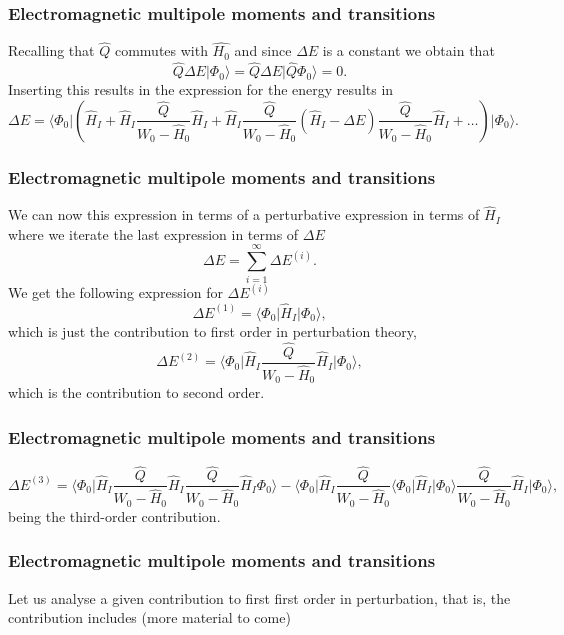 \documentclass{beamer}
\begin{document}
\begin{frame}
\frametitle{Electromagnetic multipole moments and transitions}

\begin{block}{}
Recalling that $\hat{Q}$ commutes with $\hat{H_0}$ and since $\Delta E$ is a constant we obtain that
\[
\hat{Q}\Delta E\vert \Phi_0\rangle = \hat{Q}\Delta E\vert \hat{Q}\Phi_0\rangle = 0.
\]
Inserting this results in the expression for the energy results in
\[
\Delta E=\langle \Phi_0\vert \left(\hat{H}_I+\hat{H}_I\frac{\hat{Q}}{W_0-\hat{H}_0}\hat{H}_I+
\hat{H}_I\frac{\hat{Q}}{W_0-\hat{H}_0}(\hat{H}_I-\Delta E)\frac{\hat{Q}}{W_0-\hat{H}_0}\hat{H}_I+\dots\right)\vert \Phi_0\rangle.
\]
\end{block}
\end{frame}

\begin{frame}
\frametitle{Electromagnetic multipole moments and transitions}

\begin{block}{}
We can now this expression in terms of a perturbative expression in terms
of $\hat{H}_I$ where we iterate the last expression in terms of $\Delta E$
\[
\Delta E=\sum_{i=1}^{\infty}\Delta E^{(i)}.
\]
We get the following expression for $\Delta E^{(i)}$
\[
\Delta E^{(1)}=\langle \Phi_0\vert \hat{H}_I\vert \Phi_0\rangle,
\] 
which is just the contribution to first order in perturbation theory,
\[
\Delta E^{(2)}=\langle\Phi_0\vert \hat{H}_I\frac{\hat{Q}}{W_0-\hat{H}_0}\hat{H}_I\vert \Phi_0\rangle, 
\]
which is the contribution to second order.
\end{block}
\end{frame}

\begin{frame}
\frametitle{Electromagnetic multipole moments and transitions}

\begin{block}{}
\[
\Delta E^{(3)}=\langle \Phi_0\vert \hat{H}_I\frac{\hat{Q}}{W_0-\hat{H}_0}\hat{H}_I\frac{\hat{Q}}{W_0-\hat{H}_0}\hat{H}_I\Phi_0\rangle-
\langle\Phi_0\vert \hat{H}_I\frac{\hat{Q}}{W_0-\hat{H}_0}\langle \Phi_0\vert \hat{H}_I\vert \Phi_0\rangle\frac{\hat{Q}}{W_0-\hat{H}_0}\hat{H}_I\vert \Phi_0\rangle,
\]
being the third-order contribution. 
\end{block}
\end{frame}

\begin{frame}
\frametitle{Electromagnetic multipole moments and transitions}

\begin{block}{}
Let us analyse a given contribution to first first order in perturbation, that is, the contribution includes (more material to come)
\end{block}
\end{frame}
\end{document}
